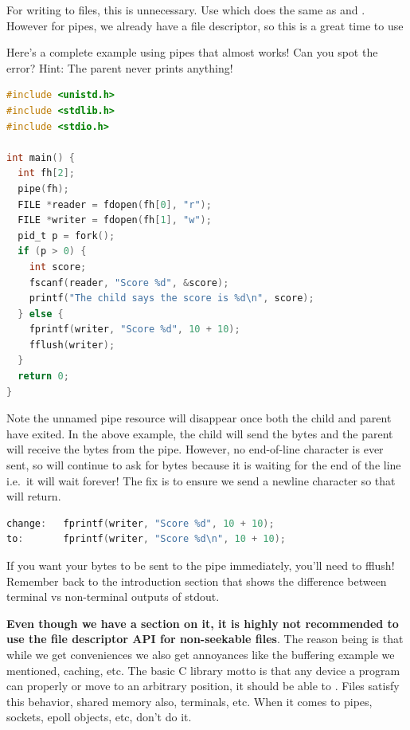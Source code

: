 For writing to files, this is unnecessary.
Use  which does the same as  and .
However for pipes, we already have a file descriptor, so this is a great time to use 

Here's a complete example using pipes that almost works!
Can you spot the error?
Hint: The parent never prints anything!

\begin{lstlisting}[language=C]
#include <unistd.h>
#include <stdlib.h>
#include <stdio.h>

int main() {
  int fh[2];
  pipe(fh);
  FILE *reader = fdopen(fh[0], "r");
  FILE *writer = fdopen(fh[1], "w");
  pid_t p = fork();
  if (p > 0) {
    int score;
    fscanf(reader, "Score %d", &score);
    printf("The child says the score is %d\n", score);
  } else {
    fprintf(writer, "Score %d", 10 + 10);
    fflush(writer);
  }
  return 0;
}
\end{lstlisting}

Note the unnamed pipe resource will disappear once both the child and parent have exited.
In the above example, the child will send the bytes and the parent will receive the bytes from the pipe.
However, no end-of-line character is ever sent, so  will continue to ask for bytes because it is waiting for the end of the line i.e.~it will wait forever! The fix is to ensure we send a newline character so that  will return.

\begin{lstlisting}[language=C]
change:   fprintf(writer, "Score %d", 10 + 10);
to:       fprintf(writer, "Score %d\n", 10 + 10);
\end{lstlisting}

If you want your bytes to be sent to the pipe immediately, you'll need to fflush!
Remember back to the introduction section that shows the difference between terminal vs non-terminal outputs of stdout.

\textbf{Even though we have a section on it, it is highly not recommended to use the file descriptor API for non-seekable files}.
The reason being is that while we get conveniences we also get annoyances like the buffering example we mentioned, caching, etc.
The basic C library motto is that any device a program can properly  or move to an arbitrary position, it should be able to .
Files satisfy this behavior, shared memory also, terminals, etc.
When it comes to pipes, sockets, epoll objects, etc, don't do it.

